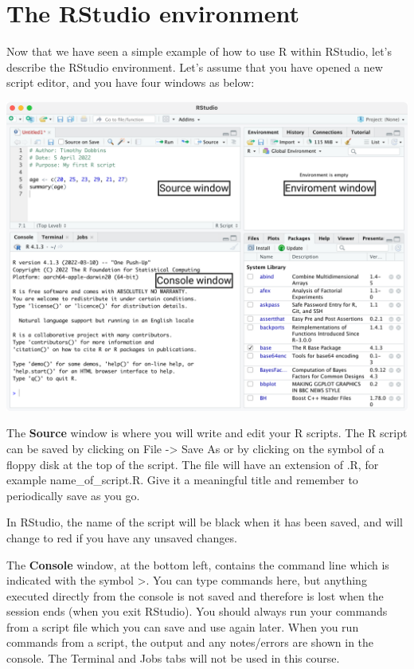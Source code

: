 \documentclass[
]{memoir}
\begin{document}
\hypertarget{the-rstudio-environment}{%
\section{The RStudio environment}\label{the-rstudio-environment}}

Now that we have seen a simple example of how to use R within RStudio, let's describe the RStudio environment. Let's assume that you have opened a new script editor, and you have four windows as below:

\includegraphics[width=1\linewidth]{img/RStudio-screenshot-03}

The \textbf{Source} window is where you will write and edit your R scripts. The R script can be saved by clicking on File -\textgreater{} Save As or by clicking on the symbol of a floppy disk at the top of the script. The file will have an extension of .R, for example name\_of\_script.R. Give it a meaningful title and remember to periodically save as you go.

In RStudio, the name of the script will be black when it has been saved, and will change to red if you have any unsaved changes.

The \textbf{Console} window, at the bottom left, contains the command line which is indicated with the symbol \textgreater. You can type commands here, but anything executed directly from the console is not saved and therefore is lost when the session ends (when you exit RStudio). You should always run your commands from a script file which you can save and use again later. When you run commands from a script, the output and any notes/errors are shown in the console. The Terminal and Jobs tabs will not be used in this course.
\end{document}
